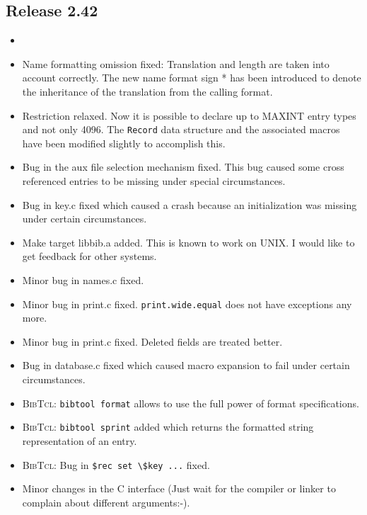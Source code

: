 \documentclass[11pt,a4paper]{scrartcl}
\newcommand\rsc[1]{\texttt{#1}}
\newcommand\File[1]{\textsf{#1}}
\newcommand\BibTcl{\textsc{BibTcl}}
\newenvironment{Release}[2]{%
  \def\tmp{#2}%
  \section*{Release #1 \ifx\tmp\empty\else{\normalsize[#2]}\fi}
  \begin{itemize}
}{\end{itemize}}
\newenvironment{Fix}[1]{\item }{}
\newenvironment{New}[1]{\item }{}
\newenvironment{Update}[1]{\item }{}
\begin{document}
\begin{multicols}
\begin{Release}{2.42}{}
\begin{Update}{gene}
  \end{Update}
  \begin{Fix}{gene}
    Name formatting omission fixed: Translation and length are taken
    into account correctly. The new name format sign * has been
    introduced to denote the inheritance of the translation from the
    calling format.
  \end{Fix}
  \begin{Update}{gene}
    Restriction relaxed. Now it is possible to declare up to MAXINT
    entry types and not only 4096. The \verb|Record| data structure
    and the associated macros have been modified slightly to
    accomplish this.
  \end{Update}
  \begin{Fix}{gene}
    Bug in the aux file selection mechanism fixed. This bug caused some cross
    referenced entries to be missing under special circumstances.
  \end{Fix}
  \begin{Fix}{gene}
    Bug in \File{key.c} fixed which caused a crash because an
    initialization was missing under certain circumstances.
  \end{Fix}
  \begin{New}{gene}
    Make target \File{libbib.a} added. This is known to work on UNIX. I would
    like to get feedback for other systems.
  \end{New}
  \begin{Fix}{gene}
    Minor bug in \File{names.c} fixed.
  \end{Fix}
  \begin{Fix}{gene}
    Minor bug in \File{print.c} fixed. \rsc{print.wide.equal} does not
    have exceptions any more.
  \end{Fix}
  \begin{Fix}{gene}
    Minor bug in \File{print.c} fixed. Deleted fields are treated better.
  \end{Fix}
  \begin{Fix}{gene}
    Bug in \File{database.c} fixed which caused macro expansion to fail under
    certain circumstances.
  \end{Fix}
  \begin{Update}{gene}
    \BibTcl: \verb|bibtool format| allows to use the full power of
    format specifications.
  \end{Update}
  \begin{New}{gene}
    \BibTcl: \verb|bibtool sprint| added which returns the formatted
    string representation of an entry.
  \end{New}
  \begin{Fix}{gene}
    \BibTcl: Bug in \verb|$rec set \$key ...| fixed.
  \end{Fix}
  \begin{Update}{gene}
    Minor changes in the C interface (Just wait for the compiler or
    linker to complain about different arguments:-).
  \end{Update}
 \end{Release}


\end{multicols}
\end{document}
